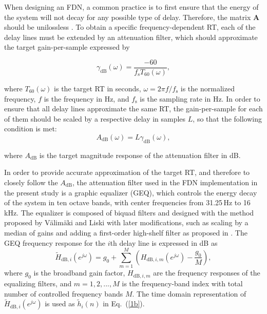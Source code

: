 \documentclass[twoside,a4paper]{article}
\begin{document}
When designing an FDN, a common practice is to first ensure that the energy of the system will not decay for any possible type of delay. Therefore, the matrix $\textbf{A}$ should be unilossless \cite{Schelcht:Habets:2017:IEEE:lossless:FDN}. To obtain a specific frequency-dependent RT, each of the delay lines must be extended by an attenuation filter, which should approximate the target gain-per-sample expressed by

\begin{equation}
	\gamma_\textrm{dB}(\omega)=\frac{-60}{f_\textrm{s} T_{60} (\omega)},
	\label{eq:gamma}
\end{equation}

\noindent where $T_{60}(\omega)$ is the target RT in seconds, $\omega = 2\pi f/f_\textrm{s}$ is the normalized frequency, $f$ is the frequency in Hz, and $f_\textrm{s}$ is the sampling rate in Hz. In order to ensure that all delay lines approximate the same RT, the gain-per-sample for each of them should be scaled by a respective delay in samples $L$, so that the following condition is met: 
\begin{equation}
	A_\textrm{dB}(\omega)=L\gamma_\textrm{dB}(\omega),
	\label{eq:attenuation}
\end{equation}

\noindent where $A_\textrm{dB}$ is the target magnitude response of the attenuation filter in dB.

In order to provide accurate approximation of the target  RT, and therefore to closely follow the $A_\textrm{dB}$, the attenuation filter used in the FDN implementation in the present study is a graphic equalizer (GEQ), which controls the energy decay of the system in ten octave bands, with center frequencies from 31.25\,Hz to 16\,kHz. The equalizer is composed of biquad filters \cite{Orfanidis:2010:introduction:SP} and designed with the method proposed by V\"alim\"aki and Liski \cite{Valimaki:Liski:2017:IEEE:accurate:equalizer} with later modifications, such as scaling by a median of gains and adding a first-order high-shelf filter as proposed in \cite{prawda:2019:improved}. The GEQ  frequency response for the $i$th delay line is expressed in dB as
\begin{equation}
    \widetilde{H}_{\textrm{dB}, i}(e^{j\omega}) = g_0+\sum_{m=1}^M \left(H_{\textrm{dB},i, m}(e^{j\omega})-\frac{g_0}{M}\right),
	\label{eq:GEQ}
\end{equation}
%
where $g_0$ is the broadband gain factor, $H_{\textrm{dB},i,m}$ are the frequency responses of the equalizing filters, and $m = 1,2,...,M$ is the frequency-band index with total number of controlled frequency bands $M$. The time domain representation of $\widetilde{H}_{\textrm{dB}, i}(e^{j\omega})$ is used as $\widetilde{h}_{i}(n)$  in Eq.~(\ref{1b}).
\end{document}
